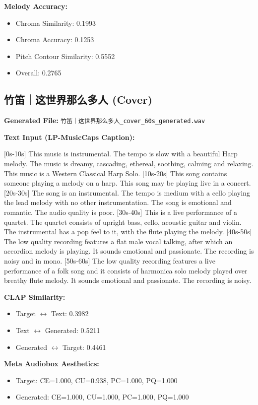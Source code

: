 \documentclass{article}
\begin{document}
\textbf{Melody Accuracy:}
\begin{itemize}
    \item Chroma Similarity: 0.1993
    \item Chroma Accuracy: 0.1253
    \item Pitch Contour Similarity: 0.5552
    \item Overall: 0.2765
\end{itemize}

\subsection{竹笛｜这世界那么多人 (Cover)}

\textbf{Generated File:} \texttt{竹笛｜这世界那么多人\_cover\_60s\_generated.wav}

\textbf{Text Input (LP-MusicCaps Caption):}

\small
[0s-10s] This music is instrumental. The tempo is slow with a beautiful Harp melody. The music is dreamy, cascading, ethereal, soothing, calming and relaxing. This music is a Western Classical Harp Solo. [10s-20s] This song contains someone playing a melody on a harp. This song may be playing live in a concert. [20s-30s] The song is an instrumental. The tempo is medium with a cello playing the lead melody with no other instrumentation. The song is emotional and romantic. The audio quality is poor. [30s-40s] This is a live performance of a quartet. The quartet consists of upright bass, cello, acoustic guitar and violin. The instrumental has a pop feel to it, with the flute playing the melody. [40s-50s] The low quality recording features a flat male vocal talking, after which an accordion melody is playing. It sounds emotional and passionate. The recording is noisy and in mono. [50s-60s] The low quality recording features a live performance of a folk song and it consists of harmonica solo melody played over breathy flute melody. It sounds emotional and passionate. The recording is noisy.
\normalsize

\textbf{CLAP Similarity:}
\begin{itemize}
    \item Target $\leftrightarrow$ Text: 0.3982
    \item Text $\leftrightarrow$ Generated: 0.5211
    \item Generated $\leftrightarrow$ Target: 0.4461
\end{itemize}

\textbf{Meta Audiobox Aesthetics:}
\begin{itemize}
    \item Target: CE=1.000, CU=0.938, PC=1.000, PQ=1.000
    \item Generated: CE=1.000, CU=1.000, PC=1.000, PQ=1.000
\end{itemize}
\end{document}
